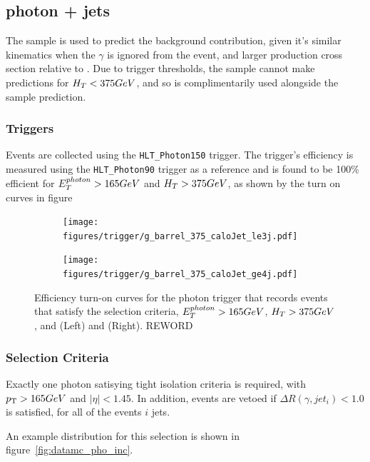 \subsection{photon + jets}
The \gj sample is used to predict the \zinv background contribution, given it's 
similar kinematics when the $\gamma$ is ignored from the event, and larger 
production cross section relative to \mmj. Due to trigger thresholds, the \gj
sample cannot make predictions for $H_T<375GeV$, and so is complimentarily used
alongside the \mmj sample prediction.

\subsubsection{Triggers}
Events are collected using the \verb!HLT_Photon150! trigger. The trigger's 
efficiency is measured using the \verb!HLT_Photon90! trigger as a reference and
is found to be 100$\%$ efficient for $E_T^{photon}>165GeV$ and $H_T>375GeV$, 
as shown by the turn on curves in figure~

\begin{figure}[ht!]
  \centering
  \begin{subfigure}[b]{0.35\textwidth}
    \texttt{[image: figures/trigger/g\_barrel\_375\_caloJet\_le3j.pdf]}
    \caption{\njlow}
    \label{fig:photon_control_trigeff_le3j}
  \end{subfigure}
  \begin{subfigure}[b]{0.35\textwidth}
    \texttt{[image: figures/trigger/g\_barrel\_375\_caloJet\_ge4j.pdf]}
    \caption{\njhigh}
    \label{fig:photon_control_trigeff_ge4j}
  \end{subfigure}
  \caption{Efficiency turn-on curves for
      the photon trigger that records events that
      satisfy the \gj selection criteria, $E_{T}^{photon} > 165GeV$, $H_T > 375GeV$, and \njlow (Left) and \njhigh
      (Right). REWORD}
  \label{fig:photon_control_trigeff}
\end{figure}

\subsubsection{Selection Criteria}
Exactly one photon satisying tight isolation criteria is required, with 
${p_{\text T}} > 165GeV$ and $|\eta|<1.45$. In addition, events are vetoed if
$\Delta R(\gamma, jet_i)<1.0$ is satisfied, for all of the events $i$ jets.

An example distribution for this selection is shown in figure~\ref{fig:datamc_pho_inc}.

